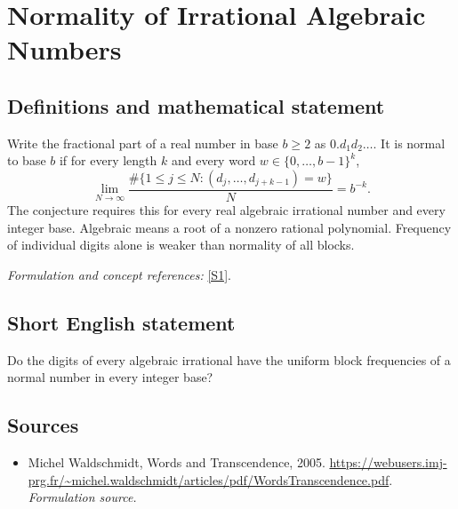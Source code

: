 \documentclass[11pt]{article}
\begin{document}
\section*{\texorpdfstring{Normality of Irrational Algebraic Numbers}{Normality of Irrational Algebraic Numbers}}\label{statement}
\subsection{Definitions and mathematical statement}
Write the fractional part of a real number in base $b\ge2$ as $0.d_1d_2\ldots$. It is normal to base $b$ if for every length $k$ and every word $w\in\{0,\ldots,b-1\}^k$,
\[
 \lim_{N\to\infty}\frac{\#\{1\le j\le N:(d_j,\ldots,d_{j+k-1})=w\}}{N}=b^{-k}.
\]
The conjecture requires this for every real algebraic irrational number and every integer base. Algebraic means a root of a nonzero rational polynomial. Frequency of individual digits alone is weaker than normality of all blocks.
\par\smallskip\textit{Formulation and concept references:} \href{https://webusers.imj-prg.fr/~michel.waldschmidt/articles/pdf/WordsTranscendence.pdf}{[S1]}.

\subsection{Short English statement}
Do the digits of every algebraic irrational have the uniform block frequencies of a normal number in every integer base?
\subsection{Sources}
\begin{itemize}
\item[S1]Michel Waldschmidt, Words and Transcendence, 2005.
\url{https://webusers.imj-prg.fr/~michel.waldschmidt/articles/pdf/WordsTranscendence.pdf}.
\textit{Formulation source.}
\end{itemize}
\end{document}
